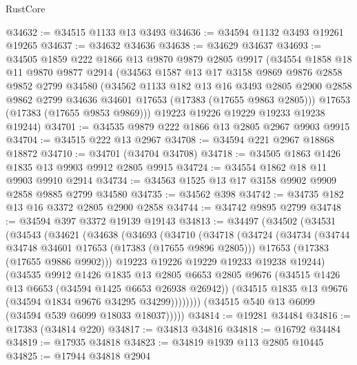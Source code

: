 \begin{lexlean}{RustCore}
\begin{coremodule}
@34632 := @34515 @1133 @13 @3493
@34636 := @34594 @1132 @3493 @19261 @19265
@34637 := @34632 @34636
@34638 := @34629 @34637
@34693 := @34505
    @1859
    @222
    @1866
    @13
    @9870
    @9879
    @2805
    @9917
    (@34554
      @1858
      @18
      @11
      @9870
      @9877
      @2914
      (@34563
        @1587
        @13
        @17
        @3158
        @9869
        @9876
        @2858
        @9852
        @2799
        @34580
        (@34562
          @1133
          @182
          @13
          @16
          @3493
          @2805
          @2900
          @2858
          @9862
          @2799
          @34636
          @34601
          @17653
          (@17383 (@17655 @9863 @2805)))
        @17653
        (@17383 (@17655 @9853 @9869)))
      @19223
      @19226
      @19229
      @19233
      @19238
      @19244)
@34701 := @34535 @9879 @222 @1866 @13 @2805 @2967 @9903 @9915
@34704 := @34515 @222 @13 @2967
@34708 := @34594 @221 @2967 @18868 @18872
@34710 := @34701 (@34704 @34708)
@34718 := @34505 @1863 @1426 @1835 @13 @9903 @9912 @2805 @9915
@34724 := @34554 @1862 @18 @11 @9903 @9910 @2914
@34734 := @34563 @1525 @13 @17 @3158 @9902 @9909 @2858 @9885 @2799 @34580
@34735 := @34562 @398
@34742 := @34735 @182 @13 @16 @3372 @2805 @2900 @2858
@34744 := @34742 @9895 @2799
@34748 := @34594 @397 @3372 @19139 @19143
@34813 := @34497
    (@34502
      (@34531
        (@34543
          (@34621
            (@34638
              (@34693
                (@34710
                  (@34718
                    (@34724
                      (@34734
                        (@34744 @34748 @34601 @17653 (@17383 (@17655 @9896 @2805)))
                        @17653
                        (@17383 (@17655 @9886 @9902)))
                      @19223
                      @19226
                      @19229
                      @19233
                      @19238
                      @19244)
                    (@34535
                      @9912
                      @1426
                      @1835
                      @13
                      @2805
                      @6653
                      @2805
                      @9676
                      (@34515 @1426 @13 @6653 (@34594 @1425 @6653 @26938 @26942))
                      (@34515 @1835 @13 @9676 (@34594 @1834 @9676 @34295 @34299))))))))
          (@34515 @540 @13 @6099 (@34594 @539 @6099 @18033 @18037)))))
@34814 := @19281 @34484
@34816 := @17383 (@34814 @220)
@34817 := @34813 @34816
@34818 := @16792 @34484
@34819 := @17935 @34818
@34823 := @34819 @1939 @113 @2805 @10445
@34825 := @17944 @34818 @2904

\end{coremodule}
\end{lexlean}
